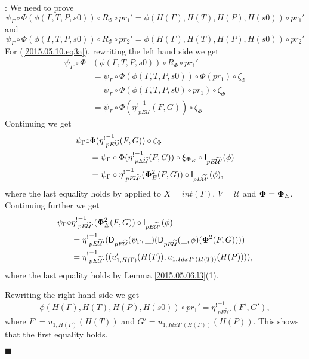 \documentclass[12pt]{article}
\numberwithin{equation}{section}
\newenvironment{eq}{\begin{equation}}{\end{equation}}
\newenvironment{myproof}{{\bf Proof}:}{$\blacksquare$ \vskip 5mm }
\newcommand{\llabel}[1]{\label{#1}}
\newcommand{\wt}{\widetilde}
\newcommand{\U}{\mathcal{U}}
\newcommand{\D}{\mathsf{D}}
\newcommand{\I}{\mathsf{I}}
\newcommand{\etashriek}{\eta^!}
\newcommand{\etaunshriek}{{\etashriek}^{-1}}
\begin{document}
\begin{myproof}
We need to prove
%
\begin{eq}
\llabel{2015.05.10.eq3a} \psi_{\Gamma}\circ \Phi(\phi(\Gamma,T,P,s0))\circ
R_{\Phi}\circ pr_1' = \phi(H(\Gamma),H(T),H(P),H(s0))\circ pr_1'
\end{eq}%
%
and
%
%
\begin{eq}
\llabel{2015.05.10.eq3b} \psi_{\Gamma}\circ \Phi(\phi(\Gamma,T,P,s0))\circ
R_{\Phi}\circ pr_2' = \phi(H(\Gamma),H(T),H(P),H(s0))\circ pr_2'
\end{eq}%
%
For (\ref{2015.05.10.eq3a}), rewriting the left hand side we get
%
\begin{align*}
  \psi_{\Gamma}\circ \Phi&(\phi(\Gamma,T,P,s0))\circ R_{\Phi}\circ pr_1'  \\
    & = \psi_{\Gamma}\circ \Phi(\phi(\Gamma,T,P,s0))\circ\Phi(pr_1)\circ \zeta_{\Phi} \\
    & = \psi_{\Gamma}\circ \Phi(\phi(\Gamma,T,P,s0)\circ pr_1)\circ \zeta_{\Phi} \\
    & = \psi_{\Gamma}\circ \Phi(\etaunshriek_{pE\wt{\U}}(F,G))\circ \zeta_{\Phi}
\end{align*}
%
Continuing we get
%
\begin{align*}
  \psi_{\Gamma}\circ & \Phi(\etaunshriek_{pE\wt{\U}}(F,G))\circ \zeta_{\Phi} \\
    & = \psi_{\Gamma}\circ \Phi(\etaunshriek_{pE\wt{\U}}(F,G))\circ \xi_{{\bf \Phi}_E}\circ \I_{pE\wt{\U}'}(\phi) \\
    & = \psi_{\Gamma}\circ\etaunshriek_{pE\wt{\U}'}({\bf\Phi}^2_E(F,G))\circ \I_{pE\wt{\U}'}(\phi),
\end{align*}
%
where the last equality holds by \cite[Lemma 5.8]{fromunivwithPi} applied to
$X=int(\Gamma)$, $V=\U$ and ${\bf\Phi}={\bf\Phi}_E$. Continuing further we get
%
\begin{align*}
  \psi_{\Gamma}\circ&\etaunshriek_{pE\wt{\U}'}({\bf\Phi}^2_E(F,G))\circ \I_{pE\wt{\U}'}(\phi) \\
    & = \etaunshriek_{pE\wt{\U}'}(\D_{pE\wt{\U}}(\psi_{\Gamma},\_)(\D_{pE\wt{\U}}(\_,\phi)({\bf\Phi}^2(F,G)))) \\
    & = \etaunshriek_{pE\wt{\U}'}((u_{1,H(\Gamma)}'(H(T)),u_{1,IdxT'(H(T))}(H(P)))),
\end{align*}
%
where the last equality holds by Lemma \ref{2015.05.06.l3}(1).

Rewriting the right hand side we get
%
$$\phi(H(\Gamma),H(T),H(P),H(s0))\circ pr_1'=\etaunshriek_{pE\wt{\U}'}(F',G'),$$
%
where $F'=u_{1,H(\Gamma)}(H(T))$ and $G'=u_{1,IdxT'(H(\Gamma))}(H(P))$.  This
shows that the first equality holds.


\end{myproof}
\end{document}
